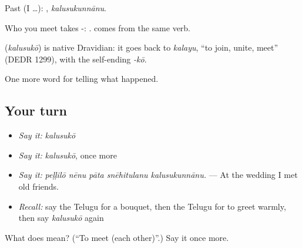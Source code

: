Past (I …): , \emph{kalusukunnānu}.

Who you meet takes -:  .   comes from the same verb.

\begin{cousinweb}
\textbf{} (\emph{kalusukō}) is native Dravidian: it goes back to \emph{kalayu}, \textquotedblleft{}to join, unite, meet\textquotedblright{} (DEDR 1299), with the self-ending \emph{-kō}.
\end{cousinweb}

\begin{grammarlens}[title={What you've built}]
One more word for telling what happened.
\end{grammarlens}

\subsection*{Your turn}
\begin{itemize}
\raggedright
  \item \emph{Say it:} \emph{kalusukō}
  \item \emph{Say it:} \emph{kalusukō}, once more
  \item \emph{Say it:} \emph{peḷḷilō nēnu pāta snēhitulanu kalusukunnānu.} — At the wedding I met old friends.
  \item \emph{Recall:} say the Telugu for a bouquet, then the Telugu for to greet warmly, then say \emph{kalusukō} again
\end{itemize}

\begin{tcolorbox}[breakable,colback=teal!4,colframe=teal!35!black,title={Before you move on}]
What does  mean? (\textquotedblleft{}To meet (each other)\textquotedblright{}.) Say it once more.
\end{tcolorbox}
